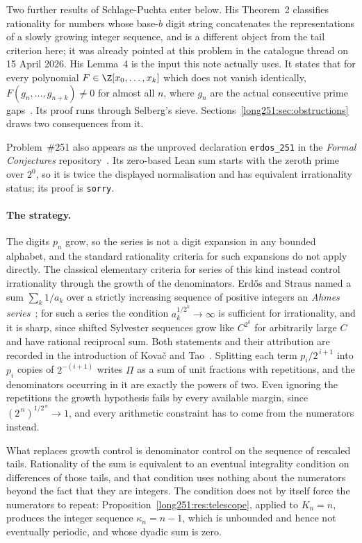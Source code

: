 Two further results of Schlage-Puchta enter below.  His Theorem~2 classifies
rationality for numbers whose base-$b$ digit string concatenates the
representations of a slowly growing integer sequence, and is a different
object from the tail criterion here; it was already pointed at this problem in
the catalogue thread on 15 April 2026.  His Lemma~4 is the input this note
actually uses.  It states that for every polynomial $F\in\Z[x_0,\ldots,x_k]$
which does not vanish identically, $F(g_n,\ldots,g_{n+k})\ne0$ for almost all
$n$, where $g_n$ are the actual consecutive prime
gaps~\cite[Lemma~4, pp.~5--6]{schlagepuchta2011}.  Its proof runs through
Selberg's sieve.  Sections~\ref{long251:sec:obstructions} draws two consequences from
it.

Problem~\#251 also appears as the unproved declaration \texttt{erdos\_251} in
the \emph{Formal Conjectures} repository~\cite{formalconjectures251}.  Its
zero-based Lean sum starts with the zeroth prime over $2^0$, so it is twice the
displayed normalisation and has equivalent irrationality status; its proof is
\texttt{sorry}.

\paragraph{The strategy.}
The digits $p_n$ grow, so the series is not a digit expansion in any bounded
alphabet, and the standard rationality criteria for such expansions do not
apply directly.  The classical elementary criteria for series of this kind
instead control irrationality through the growth of the denominators.
Erd\H{o}s and Straus named a sum $\sum_k 1/a_k$ over a strictly increasing
sequence of positive integers an \emph{Ahmes series}~\cite{erdosstraus1963};
for such a series the condition $a_k^{1/2^k}\to\infty$ is sufficient for
irrationality, and it is sharp, since shifted Sylvester sequences grow like
$C^{2^{k}}$ for arbitrarily large $C$ and have rational reciprocal sum.  Both
statements and their attribution are recorded in the introduction of Kova\v{c}
and Tao~\cite[\S1]{kovactao2024}.  Splitting each term $p_i/2^{\,i+1}$ into
$p_i$ copies of $2^{-(i+1)}$ writes $\Pi$ as a sum of unit fractions with
repetitions, and the denominators occurring in it are exactly the powers of
two.  Even ignoring the repetitions the growth hypothesis fails by every
available margin, since $(2^{\,n})^{1/2^{\,n}}\to1$, and every arithmetic
constraint has to come from the numerators instead.

What replaces growth control is denominator control on the sequence of
rescaled tails.  Rationality of the sum is equivalent to an eventual
integrality condition on differences of those tails, and that condition uses
nothing about the numerators beyond the fact that they are integers.  The
condition does not by itself force the numerators to repeat:
Proposition~\ref{long251:res:telescope}, applied to $K_n=n$, produces the integer
sequence $\kappa_n=n-1$, which is unbounded and hence not eventually periodic,
and whose dyadic sum is zero.

